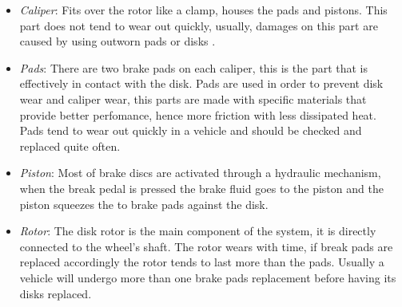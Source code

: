 		\begin{itemize}
			\item\textit{Caliper}: Fits over the rotor like a clamp, houses the pads and pistons. This part does not tend to wear out quickly, usually, damages on this part are caused by using outworn pads or disks \cite{goodyear-calipers}.\label{itm:caliper}
			\item\textit{Pads}: There are two brake pads on each caliper, this is the part that is effectively in contact with the disk. Pads are used in order to prevent disk wear and caliper wear, this parts are made with specific materials that provide better perfomance, hence more friction with less dissipated heat. Pads tend to wear out quickly in a vehicle and should be checked and replaced quite often.\label{itm:pads}
			\item\textit{Piston}: Most of brake discs are activated through a hydraulic mechanism, when the break pedal is pressed the brake fluid goes to the piston and the piston squeezes the to brake pads against the disk.\label{itm:piston}
			\item\textit{Rotor}: The disk rotor is the main component of the system, it is directly connected to the wheel's shaft. The rotor wears with time, if break pads are replaced accordingly the rotor tends to last more than the pads. Usually a vehicle will undergo more than one brake pads replacement before having its disks replaced. \label{itm:rotor}
		\end{itemize}